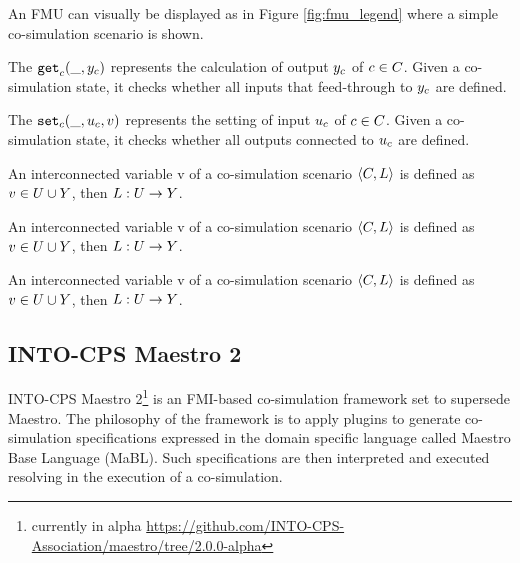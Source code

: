 \documentclass[runningheads]{llncs}
\begin{document}
An FMU can visually be displayed as in Figure \ref{fig:fmu_legend} where a simple co-simulation scenario is shown.

\begin{definition}\label{def:getout}
The $\mathtt{get}_{c}(\_, y_{c})$ represents the calculation of output $y_{c}$ of $c \in C$. Given a co-simulation state, it checks whether all inputs that feed-through to $y_{c}$ are defined.
\end{definition}

\begin{definition}\label{def:setin}
The $\mathtt{set}_{c}(\_, u_{c}, v)$ represents the setting of input $u_{c}$  of $c \in C$. Given a co-simulation state, it checks whether all outputs connected to $u_{c}$ are defined.
\end{definition}

\begin{definition}
An interconnected variable v of a co-simulation scenario $ \left\langle C, L \right\rangle $ is defined as $v \in U \cup Y$, then $L : U \to Y$.
\end{definition}

\begin{definition}
An interconnected variable v of a co-simulation scenario $ \left\langle C, L \right\rangle $ is defined as $v \in U \cup Y$, then $L : U \to Y$.
\end{definition}



\begin{definition}
An interconnected variable v of a co-simulation scenario $ \left\langle C, L \right\rangle $ is defined as $v \in U \cup Y$, then $L : U \to Y$.
\end{definition}

\subsection{INTO-CPS Maestro 2}
INTO-CPS Maestro 2\footnote{currently in alpha \url{https://github.com/INTO-CPS-Association/maestro/tree/2.0.0-alpha}}\cite{thule_maestro2_2019} is an FMI-based co-simulation framework set to supersede Maestro\cite{Maestro}. The philosophy of the framework is to apply plugins to generate co-simulation specifications expressed in the domain specific language called Maestro Base Language (MaBL). Such specifications are then interpreted and executed resolving in the execution of a co-simulation.
\end{document}

